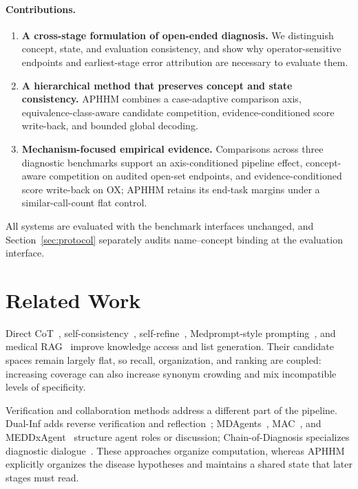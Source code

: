 \documentclass[letterpaper]{article} %
\begin{document}
\paragraph{Contributions.}
\begin{enumerate}
  \item \textbf{A cross-stage formulation of open-ended diagnosis.}
  We distinguish concept, state, and evaluation consistency, and show why operator-sensitive endpoints and earliest-stage error attribution are necessary to evaluate them.
  \item \textbf{A hierarchical method that preserves concept and state consistency.}
  APHHM combines a case-adaptive comparison axis, equivalence-class-aware candidate competition, evidence-conditioned score write-back, and bounded global decoding.
  \item \textbf{Mechanism-focused empirical evidence.}
  Comparisons across three diagnostic benchmarks support an axis-conditioned pipeline effect, concept-aware competition on audited open-set endpoints, and evidence-conditioned score write-back on OX; APHHM retains its end-task margins under a similar-call-count flat control.
\end{enumerate}

All systems are evaluated with the benchmark interfaces unchanged, and Section~\ref{sec:protocol} separately audits name--concept binding at the evaluation interface.

\section{Related Work}
\label{sec:related}

Direct CoT~\cite{wei2022cot}, self-consistency~\cite{wang2023selfconsistency}, self-refine~\cite{madaan2023selfrefine}, Medprompt-style prompting~\cite{medprompt}, and medical RAG~\cite{lewis2020rag,xiong2024medrag,medrag,imedrag} improve knowledge access and list generation.
Their candidate spaces remain largely flat, so recall, organization, and ranking are coupled: increasing coverage can also increase synonym crowding and mix incompatible levels of specificity.

Verification and collaboration methods address a different part of the pipeline.
Dual-Inf adds reverse verification and reflection~\cite{dualinf2025}; MDAgents~\cite{mdagents}, MAC~\cite{chen2025mac,mac2026}, and MEDDxAgent~\cite{meddxagent2025} structure agent roles or discussion; Chain-of-Diagnosis specializes diagnostic dialogue~\cite{chainofdiagnosis}.
These approaches organize computation, whereas APHHM explicitly organizes the disease hypotheses and maintains a shared state that later stages must read.
\end{document}
